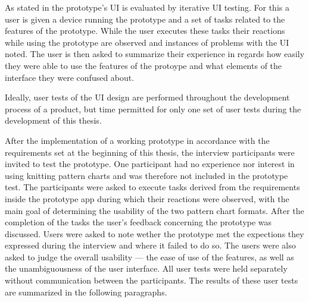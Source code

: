 As stated in  the prototype's \gls{UI} is evaluated by iterative \gls{UI} testing. For this a user is given a device running the prototype and a set of tasks related to the features of the prototype. While the user executes these tasks their reactions while using the prototype are observed and instances of problems with the \gls{UI} noted. The user is then asked to summarize their experience in regards how easily they were able to use the features of the protoype and what elements of the interface they were confused about.

Ideally, user tests of the \gls{UI} design are performed throughout the development process of a product, but time permitted for only one set of user tests during the development of this thesis.

After the implementation of a working prototype in accordance with the requirements set at the beginning of this thesis, the interview participants were invited to test the prototype. One participant had no experience nor interest in using knitting pattern charts and was therefore not included in the prototype test.
The participants were asked to execute tasks derived from the requirements inside the prototype app during which their reactions were observed, with the main goal of determining the usability of the two pattern chart formats. After the completion of the tasks the user's feedback concerning the prototype was discussed. Users were asked to note wether the prototype met the expections they expressed during the interview and where it failed to do so. The users were also asked to judge the overall usability --- the ease of use of the features, as well as the unambiguousness of the user interface. All user tests were held separately without communication between the participants. The results of these user tests are summarized in the following paragraphs.

